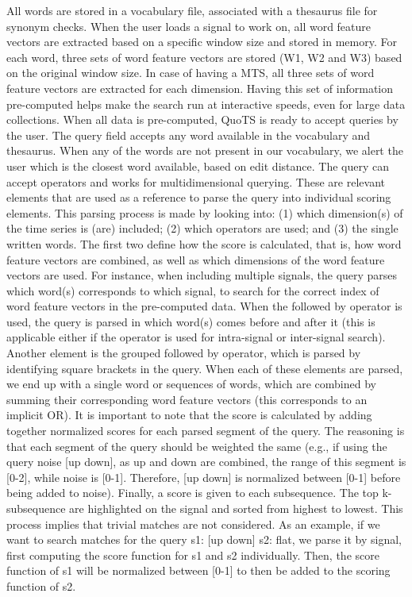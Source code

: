 All words are stored in a vocabulary file, associated with a thesaurus file for synonym checks. When the user loads a signal to work on, all word feature vectors are extracted based on a specific window size and stored in memory. For each word, three sets of word feature vectors are stored (W1, W2 and W3) based on the original window size.  In case of having a MTS, all three sets of word feature vectors are extracted for each dimension. Having this set of information pre-computed helps make the search run at interactive speeds, even for large data collections. 
When all data is pre-computed, QuoTS is ready to accept queries by the user. The query field accepts any word available in the vocabulary and thesaurus. When any of the words are not present in our vocabulary, we alert the user which is the closest word available, based on edit distance. The query can accept operators and works for multidimensional querying. These are relevant elements that are used as a reference to parse the query into individual scoring elements. This parsing process is made by looking into: (1) which dimension(s) of the time series is (are) included; (2) which operators are used; and (3) the single written words. The first two define how the score is calculated, that is, how word feature vectors are combined, as well as which dimensions of the word feature vectors are used. For instance, when including multiple signals, the query parses which word(s) corresponds to which signal, to search for the correct index of word feature vectors in the pre-computed data. When the followed by operator is used, the query is parsed in which word(s) comes before and after it (this is applicable either if the operator is used for intra-signal or inter-signal search). Another element is the grouped followed by operator, which is parsed by identifying square brackets in the query.
When each of these elements are parsed, we end up with a single word or sequences of words, which are combined by summing their corresponding word feature vectors (this corresponds to an implicit OR). It is important to note that the score is calculated by adding together normalized scores for each parsed segment of the query. The reasoning is that each segment of the query should be weighted the same (e.g., if using the query noise [up down], as up and down are combined, the range of this segment is [0-2], while noise is [0-1]. Therefore, [up down] is normalized between [0-1] before being added to noise).  Finally, a score is given to each subsequence. The top k-subsequence are highlighted on the signal and sorted from highest to lowest. This process implies that trivial matches are not considered. As an example, if we want to search matches for the query s1: [up down] s2: flat, we parse it by signal, first computing the score function for s1 and s2 individually. Then, the score function of s1 will be normalized between [0-1] to then be added to the scoring function of s2.





